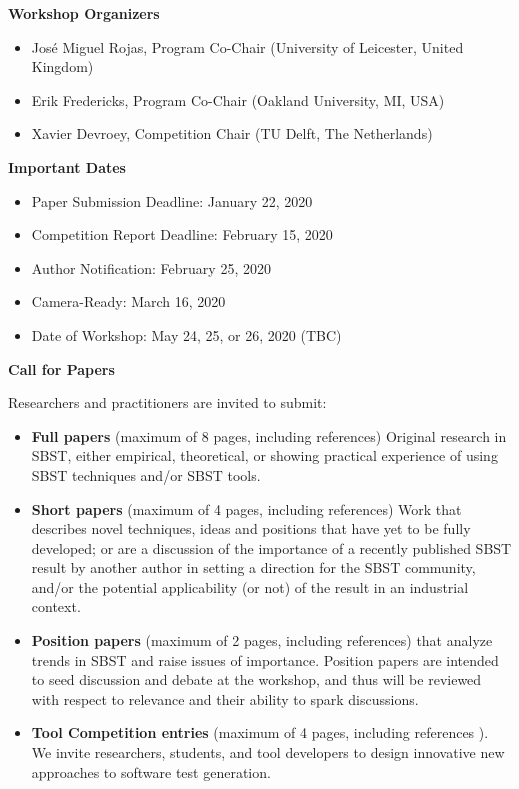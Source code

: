 \documentclass[10pt,conference]{IEEEtran}
\begin{document}
\smallskip\noindent\textbf{Workshop Organizers}
\begin{itemize}
\setlength{\itemsep}{1pt}
  \setlength{\parskip}{0pt}
  \setlength{\parsep}{0pt}
\item{Jos{\'e} Miguel Rojas, Program Co-Chair \newline 
(University of Leicester, United Kingdom)}
\item{Erik Fredericks, Program Co-Chair \newline 
    (Oakland University, MI, USA)}
\item{Xavier Devroey, Competition Chair \newline
(TU Delft, The Netherlands)}
\end{itemize}

\smallskip\noindent\textbf{Important Dates}
\begin{itemize}
\setlength{\itemsep}{1pt}
  \setlength{\parskip}{0pt}
  \setlength{\parsep}{0pt}
\item{Paper Submission Deadline: January 22, 2020}
\item{Competition Report Deadline: February 15, 2020}
\item{Author Notification: February 25, 2020}
\item{Camera-Ready: March 16, 2020}
\item{Date of Workshop: May 24, 25, or 26, 2020 (TBC)}
\end{itemize}

\smallskip\noindent\textbf{Call for Papers}

\noindent Researchers and practitioners are invited to submit:
\begin{itemize}
\setlength{\itemsep}{1pt}
  \setlength{\parskip}{0pt}
  \setlength{\parsep}{0pt}
\item \textbf{Full papers} (maximum of 8 pages, including references)
  Original research in SBST, either empirical, theoretical, or
  showing practical experience of using SBST techniques and/or SBST
  tools.
  \item \textbf{Short papers} (maximum of 4 pages, including
    references) Work that describes novel techniques, ideas and
    positions that have yet to be fully developed; or are a discussion
    of the importance of a recently published SBST result by another
    author in setting a direction for the SBST community, and/or the
    potential applicability (or not) of the result in an industrial
    context.
  \item \textbf{Position papers} (maximum of 2 pages, including
    references) that analyze trends in SBST and raise issues of
    importance. Position papers are intended to seed discussion and
    debate at the workshop, and thus will be reviewed with respect to
    relevance and their ability to spark discussions.
  \item \textbf{Tool Competition entries} (maximum of 4 pages,
    including references
    ). We invite researchers, students, and tool
    developers to design innovative new approaches to software test
    generation.
\end{itemize}
\end{document}
